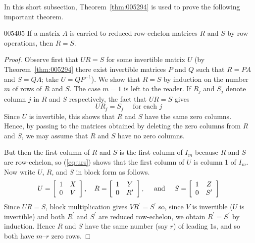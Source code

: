 In this short subsection, Theorem~\ref{thm:005294} is used to prove the following important theorem.

\begin{theorem}{}{005405}
If a matrix $A$ is carried to reduced row-echelon matrices $R$ and $S$ by row operations, then $R = S$.
\end{theorem}

\begin{proof}
Observe first that $UR = S$ for some invertible matrix $U$ (by Theorem~\ref{thm:005294} there exist invertible matrices $P$ and $Q$ such that $R = PA$ and $S = QA$; take $U = QP^{-1}$). We show that $R = S$ by induction on the number $m$ of rows of $R$ and $S$. The case $m = 1$ is left to the reader. If $R_{j}$ and $S_{j}$ denote column $j$ in $R$ and $S$ respectively, the fact that $UR = S$ gives
\begin{equation} \label{eq:urs}
UR_{j} = S_{j} \quad \mbox{ for each } j
\end{equation}
Since $U$ is invertible, this shows that $R$ and $S$ have the same zero columns. Hence, by passing to the matrices obtained by deleting the zero columns from $R$ and $S$, we may assume that $R$ and $S$ have no zero columns.

But then the first column of $R$ and $S$ is the first column of $I_{m}$ because $R$ and $S$ are row-echelon, so (\ref{eq:urs}) shows that the first column of $U$ is column 1 of $I_{m}$. Now write $U$, $R$, and $S$ in block form as follows.
\begin{equation*}
U = \left[ \begin{array}{cc}
1 & X \\
0 & V
\end{array} \right], \quad
R = \left[ \begin{array}{cc}
1 & Y \\
0 & R^\prime
\end{array} \right], \quad \mbox{ and } \quad
S = \left[ \begin{array}{cc}
1 & Z \\
0 & S^\prime
\end{array} \right]
\end{equation*}
Since $UR = S$, block multiplication gives $VR^\prime = S^\prime$ so, since $V$ is invertible ($U$ is invertible) and both $R^\prime$ and $S^\prime$ are reduced row-echelon, we obtain $R^\prime = S^\prime$ by induction. Hence $R$ and $S$ have the same number (say $r$) of leading $1$s, and so both have $m$--$r$ zero rows.


\end{proof}
